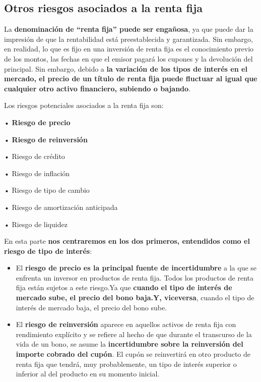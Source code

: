 \documentclass[
  letterpaper,
  DIV=11,
  numbers=noendperiod]{scrreprt}
\begin{document}
\begin{tcolorbox}
\subsection{Otros riesgos asociados a la renta
fija}\label{otros-riesgos-asociados-a-la-renta-fija}

La \textbf{denominación de ``renta fija'' puede ser engañosa}, ya que
puede dar la impresión de que la rentabilidad está preestablecida y
garantizada. Sin embargo, en realidad, lo que es fijo en una inversión
de renta fija es el conocimiento previo de los montos, las fechas en que
el emisor pagará los cupones y la devolución del principal. Sin embargo,
debido a \textbf{la variación de los tipos de interés en el mercado, el
precio de un título de renta fija puede fluctuar al igual que cualquier
otro activo financiero, subiendo o bajando}.

Los riesgos potenciales asociados a la renta fija son:

• \textbf{Riesgo de precio}

• \textbf{Riesgo de reinversión}

• Riesgo de crédito

• Riesgo de inflación

• Riesgo de tipo de cambio

• Riesgo de amortización anticipada

• Riesgo de liquidez

En esta parte \textbf{nos centraremos en los dos primeros, entendidos
como el riesgo de tipo de interés}:

\begin{itemize}
\item
  El \textbf{riesgo de precio es la principal fuente de incertidumbre} a
  la que se enfrenta un inversor en productos de renta fija. Todos los
  productos de renta fija están sujetos a este riesgo.Ya que
  \textbf{cuando el tipo de interés de mercado sube, el precio del bono
  baja.Y, viceversa}, cuando el tipo de interés de mercado baja, el
  precio del bono sube.
\item
  El \textbf{riesgo de reinversión} aparece en aquellos activos de renta
  fija con rendimiento explícito y se refiere al hecho de que durante el
  transcurso de la vida de un bono, se asume la \textbf{incertidumbre
  sobre la reinversión del importe cobrado del cupón}. El cupón se
  reinvertirá en otro producto de renta fija que tendrá, muy
  probablemente, un tipo de interés superior o inferior al del producto
  en su momento inicial.
\end{itemize}


\end{tcolorbox}
\end{document}
